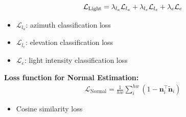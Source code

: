 \documentclass[landscape,a0paper,fontscale=0.292]{baposter}
\newcommand{\vn}{\boldsymbol{n}}
\begin{document}
\begin{poster}
{\begin{minipage}[t]{0.48\linewidth}
        \begin{equation*}
            \mathcal{L}_{\text{Light}} = \lambda_{l_a} \mathcal{L}_{l_a} + \lambda_{l_e} \mathcal{L}_{l_e} + \lambda_e \mathcal{L}_e
            \vspace{-0.6em}
        \end{equation*}
        \begin{itemize}
            \item $\mathcal{L}_{l_a}$: azimuth classification loss
            \item $\mathcal{L}_{l_e}$: elevation classification loss
            \item $\mathcal{L}_e$: light intensity classification loss
        \end{itemize}

        \vspace{0.5em} 
        \textbf{\color{blue}Loss function for Normal Estimation:}
        \vspace{-0.6em}
        \begin{align*}
            \mathcal{L}_{\text{Normal}} = \frac{1}{hw} \sum_{i}^{hw} \left(1 - \vn_i^\top \tilde{\vn}_{i} \right)
        \end{align*}
        \begin{itemize}
            \vspace{-0.6em}
            \item Cosine similarity loss
        \end{itemize}
   \end{minipage}
}


\end{poster}
\end{document}
